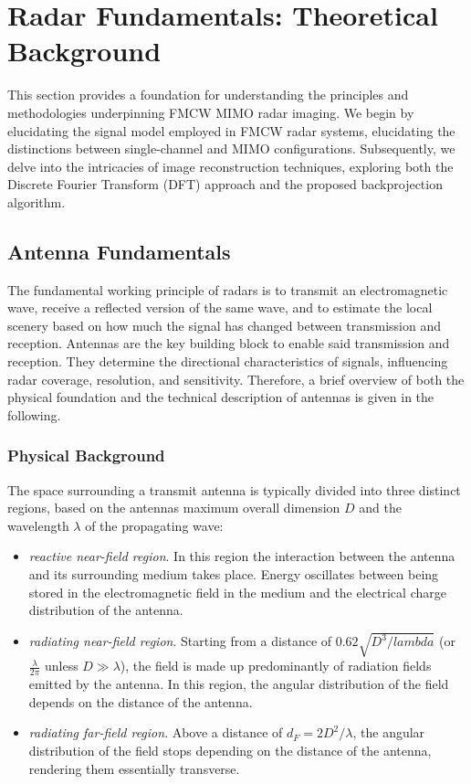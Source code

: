 \chapter{Radar Fundamentals: Theoretical Background}
\label{ch:fundamentals}
This section provides a foundation for understanding the principles and methodologies underpinning FMCW MIMO radar imaging.
We begin by elucidating the signal model employed in FMCW radar systems,
elucidating the distinctions between single-channel and MIMO configurations.
Subsequently, we delve into the intricacies of image reconstruction techniques,
exploring both the Discrete Fourier Transform (DFT) approach and the proposed backprojection algorithm.

\section{Antenna Fundamentals}

The fundamental working principle of radars is to transmit an electromagnetic wave,
receive a reflected version of the same wave,
and to estimate the local scenery based on how much the signal has changed between transmission and reception.
Antennas are the key building block to enable said transmission and reception.
They determine the directional characteristics of signals,
influencing radar coverage, resolution, and sensitivity.
Therefore, a brief overview of both the physical foundation
and the technical description of antennas is given in the following.

\subsection{Physical Background}

The space surrounding a transmit antenna is typically divided into three distinct regions,
based on the antennas maximum overall dimension $D$ and the wavelength $\lambda$ of the propagating wave:
\begin{itemize}
    \item \emph{reactive near-field region}.
          In this region the interaction between the antenna and its surrounding medium takes place.
          Energy oscillates between being stored in the electromagnetic field in the medium
          and the electrical charge distribution of the antenna.

    \item \emph{radiating near-field region}.
          Starting from a distance of $0.62\sqrt{D^3/lambda}$ (or $\frac{\lambda}{2\pi}$ unless $D\gg\lambda$),
          the field is made up predominantly of radiation fields emitted by the antenna.
          In this region, the angular distribution of the field depends on the distance of the antenna.

    \item \emph{radiating far-field region}.
          Above a distance of $d_F = 2D^2/\lambda$,
          the angular distribution of the field stops depending on the distance of the antenna,
          rendering them essentially transverse.
\end{itemize}

